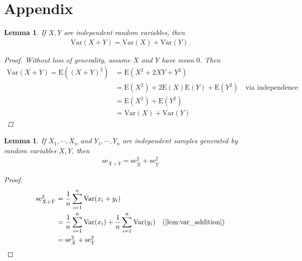 \documentclass[12pt]{amsbook}
\newcommand{\e}{\mathrm{E}}
\newcommand{\se}{\mathrm{se}}
\newcommand{\var}{\mathrm{Var}}
\theoremstyle{plain}
\newtheorem{lemma}[theorem]{Lemma}
\theoremstyle{definition}
\theoremstyle{remark}
\numberwithin{equation}{section}  %
\numberwithin{equation}{section}  %
\begin{document}
\part{Appendix}
\begin{lemma}
	\label{lem:var_addition}
If $X,Y$ are independent random variables, then
\begin{equation*}
\begin{split}
	\var(X+Y) = \var(X) + \var(Y).
\end{split}
\end{equation*}
\begin{proof}
Without loss of generality, assume $X$ and $Y$ have mean $0$. Then
\begin{equation*}
\begin{split}
	\var(X+Y) =  \e( (X + Y)^{2} ) & = \e(X^{2} + 2XY + Y^{2})
	\\
	& = \e(X^{2}) + 2 \e(X) \e(Y) + \e(Y^{2}) \quad \text{via independence}
	\\
	& = \e(X^{2}) + \e(Y^{2})
	\\
	& = \var(X) + \var(Y)
\end{split}
\end{equation*}

\end{proof}

\end{lemma}
\begin{lemma}
	If $X_{1}, \cdots, X_{n}$ and $Y_{1}, \cdots, Y_{n}$ are independent samples
	generated by random variables $X, Y$,
	then
	\begin{equation*}
	\begin{split}
		\se_{\bar{X} + \bar{Y}} = \se_{\bar{X}}^{2} + \se_{\bar{Y}}^{2}	
	\end{split}
	\end{equation*}
	
\end{lemma}
\begin{proof}
	\begin{equation*}
	\begin{split}
	\se_{\bar{X} + \bar{Y}}^{2}
	& = \frac{1}{n}\sum_{i=1}^{n} \var(x_{i} +
	y_{i}) \\
	& = \frac{1}{n}\sum_{i=1}^{n}\var(x_{i}) +
	\frac{1}{n}\sum_{i=1}^{n}\var(y_{i}) \quad (\Cref{lem:var_addition})
	\\
	& = \se_{\bar{X}}^{2} + \se_{\bar{Y}}^{2}
	\end{split}
	\end{equation*}
\end{proof}


\end{document}
